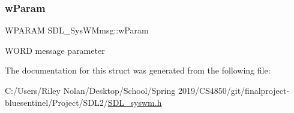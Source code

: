 \subsubsection{\texorpdfstring{wParam}{wParam}}
{\footnotesize\ttfamily W\+P\+A\+R\+AM S\+D\+L\+\_\+\+Sys\+W\+Mmsg\+::w\+Param}

W\+O\+RD message parameter 

The documentation for this struct was generated from the following file\+:\begin{DoxyCompactItemize}
\item 
C\+:/\+Users/\+Riley Nolan/\+Desktop/\+School/\+Spring 2019/\+C\+S4850/git/finalproject-\/bluesentinel/\+Project/\+S\+D\+L2/\mbox{\hyperlink{_s_d_l__syswm_8h}{S\+D\+L\+\_\+syswm.\+h}}\end{DoxyCompactItemize}
